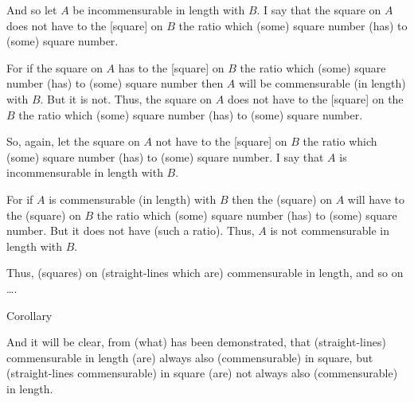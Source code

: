 \begin{Parallel}{}{}
{And so let $A$ be incommensurable in length with $B$. I say that
 the square on $A$ does not have to the [square] on $B$ the ratio
which (some) square number (has) to (some) square number.

For if the square on $A$ has to the [square] on $B$ the ratio which
(some) square number (has) to (some) square number then $A$
will be commensurable (in length) with $B$. But it is not. Thus, the square on $A$
does not have to the [square] on the $B$ the ratio which (some)
square number (has) to (some) square number.

So, again, let the square on $A$ not have to the [square] on $B$
the ratio which (some) square number (has) to (some) square number.
I say that $A$ is incommensurable in length with $B$.

For if $A$ is commensurable (in length) with $B$ then  the 
(square) on $A$ will have to the (square) on $B$ the ratio which (some) square
number (has) to (some) square number. But it does not have (such a ratio). 
Thus, $A$ is not commensurable in length with $B$.

Thus, (squares) on (straight-lines which are) commensurable in length,
and so on \ldots.\\

\begin{center}
{\large Corollary}
\end{center}\vspace*{-7pt}

And it will be clear, from (what) has been demonstrated, that (straight-lines)
commensurable in length (are) always also (commensurable) in square, 
but (straight-lines commensurable) in square (are) not always also (commensurable)
in length.}
\end{Parallel}


\vspace{7pt}{\footnotesize\noindent$^\dag$ There is an unstated assumption here that if $\alpha:\beta::\gamma:\delta$ then $\alpha^2:\beta^2::\gamma^2:\delta^2$.\\[0.5ex]
$^\ddag$ There is an unstated
assumption here that if $\alpha^2:\beta^2::\gamma^2:\delta^2$ then $\alpha:\beta::\gamma:\delta$.}

